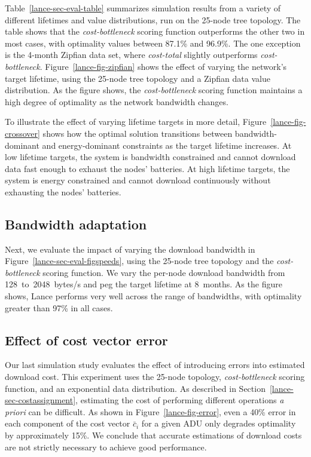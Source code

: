 Table~\ref{lance-sec-eval-table} summarizes simulation results from a variety
of different lifetimes and value distributions, run on the 25-node tree
topology. The table shows that the \textit{cost-bottleneck} scoring function
outperforms the other two in most cases, with optimality values between
87.1\% and 96.9\%. The one exception is the 4-month Zipfian data set, where
\textit{cost-total} slightly outperforms \textit{cost-bottleneck}.
Figure~\ref{lance-fig-zipfian} shows the effect of varying the network's
target lifetime, using the 25-node tree topology and a Zipfian data value
distribution. As the figure shows, the \textit{cost-bottleneck} scoring
function maintains a high degree of optimality as the network bandwidth
changes.

To illustrate the effect of varying lifetime targets in more detail,
Figure~\ref{lance-fig-crossover} shows how the optimal solution transitions
between bandwidth-dominant and energy-dominant constraints as the target
lifetime increases. At low lifetime targets, the system is bandwidth
constrained and cannot download data fast enough to exhaust the nodes'
batteries. At high lifetime targets, the system is energy constrained and
cannot download continuously without exhausting the nodes' batteries.

\subsection{Bandwidth adaptation}
\label{lance-sec-eval-params}

Next, we evaluate the impact of varying the download bandwidth in
Figure~\ref{lance-sec-eval-figspeeds}, using the 25-node tree topology and
the \textit{cost-bottleneck} scoring function. We vary the per-node download
bandwidth from 128~to~2048~bytes/s and peg the target lifetime at 8~months.
As the figure shows, Lance performs very well across the range of bandwidths,
with optimality greater than 97\% in all cases.

\subsection{Effect of cost vector error}

Our last simulation study evaluates the effect of introducing errors into
estimated download cost. This experiment uses the 25-node topology,
\textit{cost-bottleneck} scoring function, and an exponential data
distribution. As described in Section~\ref{lance-sec-costassignment}, estimating
the cost of performing different operations \textit{a priori} can be difficult.
As shown in Figure~\ref{lance-fig-error}, even a 40\% error in each
component of the cost vector $\bar{c}_i$ for a given ADU only degrades
optimality by approximately 15\%. We conclude that accurate estimations
of download costs are not strictly necessary to achieve good performance.

